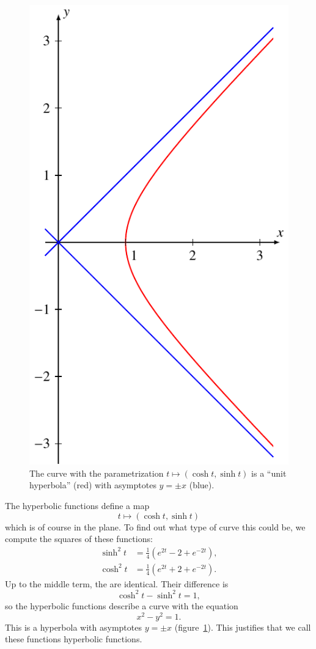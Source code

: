 \begin{figure}
\centering
\includegraphics{b-sinh/images/hyperbola.pdf}
\caption{The curve with the parametrization
$t\mapsto (\cosh t, \sinh t)$ is a ``unit hyperbola'' (red) with 
asymptotes
$y=\pm x$ (blue).
\label{anhang:hyperbel}}
\end{figure}
The hyperbolic functions define a map
\[
t\mapsto (\cosh t, \sinh t)
\]
which is of course in the plane.
To find out what type of curve this could be, we compute the
squares of these functions:
\begin{align}
\sinh^2 t&=\frac14(e^{2t}-2+e^{-2t}),
\\
\cosh^2 t&=\frac14(e^{2t}+2+e^{-2t}).
\label{hyp:definition}
\end{align}
Up to the middle term, the are identical.
Their difference is
\[
\cosh^2t - \sinh^2t=1,
\]
so the hyperbolic functions describe a curve with the equation
\[
x^2-y^2=1.
\]
This is a hyperbola with asymptotes $y=\pm x$
(figure~\ref{anhang:hyperbel}).
This justifies that we call these functions hyperbolic functions.


